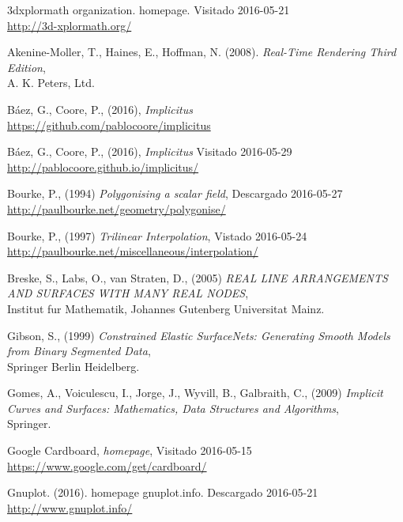 \documentclass[12pt]{article}
\begin{document}
\begin{thebibliography}{9}

3dxplormath organization. homepage. 
Visitado 2016-05-21 
\\\url{http://3d-xplormath.org/}

Akenine-Moller, T., Haines, E., Hoffman, N. (2008). \textit{Real-Time Rendering Third Edition},\\A. K. Peters, Ltd.

Báez, G., Coore, P., (2016), \textit{Implicitus}
\\\url{https://github.com/pablocoore/implicitus}

Báez, G., Coore, P., (2016), \textit{Implicitus}
Visitado 2016-05-29 
\\\url{http://pablocoore.github.io/implicitus/}

Bourke, P., (1994) \textit{Polygonising a scalar field},
Descargado 2016-05-27 
\\\url{http://paulbourke.net/geometry/polygonise/}

Bourke, P., (1997) \textit{Trilinear Interpolation},
Vistado 2016-05-24 
\\\url{http://paulbourke.net/miscellaneous/interpolation/}

Breske, S., Labs, O., van Straten, D., (2005) \textit{REAL LINE ARRANGEMENTS AND SURFACES WITH MANY REAL NODES},\\
Institut fur Mathematik, Johannes Gutenberg Universitat Mainz.

Gibson, S., (1999) \textit{Constrained Elastic SurfaceNets: Generating Smooth Models from Binary Segmented Data},\\
Springer Berlin Heidelberg.

Gomes, A., Voiculescu, I., Jorge, J., Wyvill, B., Galbraith, C., (2009) \textit{Implicit Curves and Surfaces: Mathematics, Data Structures and Algorithms},\\
Springer.

Google Cardboard, \textit{homepage},
Visitado 2016-05-15 
\\\url{https://www.google.com/get/cardboard/}

Gnuplot. (2016). homepage gnuplot.info. 
Descargado 2016-05-21 
\\\url{http://www.gnuplot.info/}


\end{thebibliography}
\end{document}

